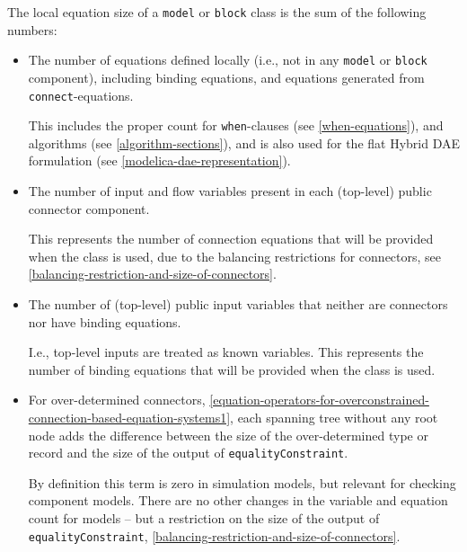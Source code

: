 \begin{definition}
The local equation size of a \lstinline!model! or \lstinline!block! class is the sum of the following numbers:
\begin{itemize}
\item
  The number of equations defined locally (i.e., not in any \lstinline!model! or \lstinline!block! component), including binding equations, and equations generated from \lstinline!connect!-equations.
  \begin{nonnormative}
  This includes the proper count for \lstinline!when!-clauses (see \cref{when-equations}), and algorithms (see \cref{algorithm-sections}), and is also used for the flat Hybrid DAE formulation (see \cref{modelica-dae-representation}).
  \end{nonnormative}
\item
  The number of input and flow variables present in each (top-level) public connector component.
  \begin{nonnormative}
  This represents the number of connection equations that will be provided when the class is used, due to the balancing restrictions for connectors, see \cref{balancing-restriction-and-size-of-connectors}.
  \end{nonnormative}
\item
  The number of (top-level) public input variables that neither are connectors nor have binding equations.
  \begin{nonnormative}
  I.e., top-level inputs are treated as known variables.
  This represents the number of binding equations that will be provided when the class is used.
  \end{nonnormative}
\item
  For over-determined connectors, \cref{equation-operators-for-overconstrained-connection-based-equation-systems1}, each spanning tree without any root node adds the difference between the size of the over-determined type or record and the size of the output of \lstinline!equalityConstraint!.
\begin{nonnormative}
  By definition this term is zero in simulation models, but relevant for checking component models.
  There are no other changes in the variable and equation count for models -- but a restriction on the size of the output of \lstinline!equalityConstraint!, \cref{balancing-restriction-and-size-of-connectors}.
\end{nonnormative}
\end{itemize}
\end{definition}

